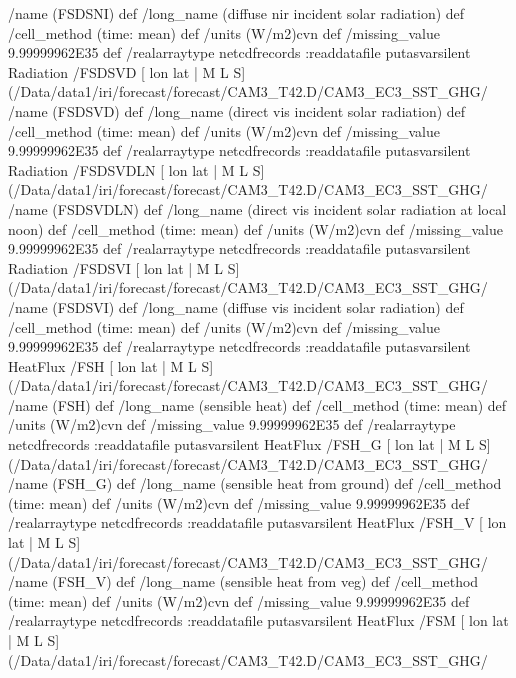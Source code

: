 \begin{ingrid}
{/name (FSDSNI) def
 /long_name (diffuse nir incident solar radiation) def
 /cell_method (time: mean) def
 /units (W/m2)cvn def
 /missing_value 9.99999962E35 def
 /realarraytype netcdfrecords :readdatafile
}putasvarsilent
Radiation /FSDSVD{
[ lon lat | M L S] (/Data/data1/iri/forecast/forecast/CAM3_T42.D/CAM3_EC3_SST_GHG/%
/name (FSDSVD) def
 /long_name (direct vis incident solar radiation) def
 /cell_method (time: mean) def
 /units (W/m2)cvn def
 /missing_value 9.99999962E35 def
 /realarraytype netcdfrecords :readdatafile
}putasvarsilent
Radiation /FSDSVDLN{
[ lon lat | M L S] (/Data/data1/iri/forecast/forecast/CAM3_T42.D/CAM3_EC3_SST_GHG/%
/name (FSDSVDLN) def
 /long_name (direct vis incident solar radiation at local noon) def
 /cell_method (time: mean) def
 /units (W/m2)cvn def
 /missing_value 9.99999962E35 def
 /realarraytype netcdfrecords :readdatafile
}putasvarsilent
Radiation /FSDSVI{
[ lon lat | M L S] (/Data/data1/iri/forecast/forecast/CAM3_T42.D/CAM3_EC3_SST_GHG/%
/name (FSDSVI) def
 /long_name (diffuse vis incident solar radiation) def
 /cell_method (time: mean) def
 /units (W/m2)cvn def
 /missing_value 9.99999962E35 def
 /realarraytype netcdfrecords :readdatafile
}putasvarsilent
HeatFlux /FSH{
[ lon lat | M L S] (/Data/data1/iri/forecast/forecast/CAM3_T42.D/CAM3_EC3_SST_GHG/%
/name (FSH) def
 /long_name (sensible heat) def
 /cell_method (time: mean) def
 /units (W/m2)cvn def
 /missing_value 9.99999962E35 def
 /realarraytype netcdfrecords :readdatafile
}putasvarsilent
HeatFlux /FSH_G{
[ lon lat | M L S] (/Data/data1/iri/forecast/forecast/CAM3_T42.D/CAM3_EC3_SST_GHG/%
/name (FSH_G) def
 /long_name (sensible heat from ground) def
 /cell_method (time: mean) def
 /units (W/m2)cvn def
 /missing_value 9.99999962E35 def
 /realarraytype netcdfrecords :readdatafile
}putasvarsilent
HeatFlux /FSH_V{
[ lon lat | M L S] (/Data/data1/iri/forecast/forecast/CAM3_T42.D/CAM3_EC3_SST_GHG/%
/name (FSH_V) def
 /long_name (sensible heat from veg) def
 /cell_method (time: mean) def
 /units (W/m2)cvn def
 /missing_value 9.99999962E35 def
 /realarraytype netcdfrecords :readdatafile
}putasvarsilent
HeatFlux /FSM{
[ lon lat | M L S] (/Data/data1/iri/forecast/forecast/CAM3_T42.D/CAM3_EC3_SST_GHG/%
}
\end{ingrid}

